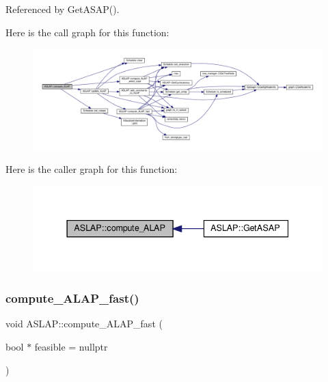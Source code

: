 Referenced by Get\+A\+S\+A\+P().

Here is the call graph for this function\+:
\nopagebreak
\begin{figure}[H]
\begin{center}
\leavevmode
\includegraphics[width=350pt]{d9/d2a/classASLAP_a5668d3b6ee0112bd3881444a684c8c2f_cgraph}
\end{center}
\end{figure}
Here is the caller graph for this function\+:
\nopagebreak
\begin{figure}[H]
\begin{center}
\leavevmode
\includegraphics[width=337pt]{d9/d2a/classASLAP_a5668d3b6ee0112bd3881444a684c8c2f_icgraph}
\end{center}
\end{figure}
\mbox{\label{classASLAP_a6baa077e9e86116db4997b1a65e891fc}} 
\subsubsection{\texorpdfstring{compute\+\_\+\+A\+L\+A\+P\+\_\+fast()}{compute\_ALAP\_fast()}}
{\footnotesize\ttfamily void A\+S\+L\+A\+P\+::compute\+\_\+\+A\+L\+A\+P\+\_\+fast (\begin{DoxyParamCaption}\item[{bool $\ast$}]{feasible = {\ttfamily nullptr} }\end{DoxyParamCaption})\hspace{0.3cm}{\ttfamily [private]}}




